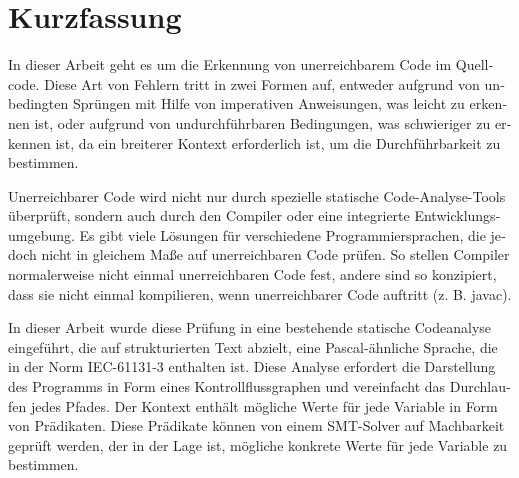 \chapter{Kurzfassung}

\begin{german}
In dieser Arbeit geht es um die Erkennung von unerreichbarem Code im Quellcode. Diese Art von Fehlern tritt in zwei Formen auf, entweder aufgrund von unbedingten Sprüngen mit Hilfe von imperativen Anweisungen, was leicht zu erkennen ist, oder aufgrund von undurchführbaren Bedingungen, was schwieriger zu erkennen ist, da ein breiterer Kontext erforderlich ist, um die Durchführbarkeit zu bestimmen.


Unerreichbarer Code wird nicht nur durch spezielle statische Code-Analyse-Tools überprüft, sondern auch durch den Compiler oder eine integrierte Entwicklungsumgebung. Es gibt viele Lösungen für verschiedene Programmiersprachen, die jedoch nicht in gleichem Maße auf unerreichbaren Code prüfen. So stellen Compiler normalerweise nicht einmal unerreichbaren Code fest, andere sind so konzipiert, dass sie nicht einmal kompilieren, wenn unerreichbarer Code auftritt (z. B. javac).


In dieser Arbeit wurde diese Prüfung in eine bestehende statische Codeanalyse eingeführt, die auf strukturierten Text abzielt, eine Pascal-ähnliche Sprache, die in der Norm IEC-61131-3 enthalten ist. Diese Analyse erfordert die Darstellung des Programms in Form eines Kontrollflussgraphen und vereinfacht das Durchlaufen jedes Pfades. Der Kontext enthält mögliche Werte für jede Variable in Form von Prädikaten. Diese Prädikate können von einem SMT-Solver auf Machbarkeit geprüft werden, der in der Lage ist, mögliche konkrete Werte für jede Variable zu bestimmen. 

\end{german}